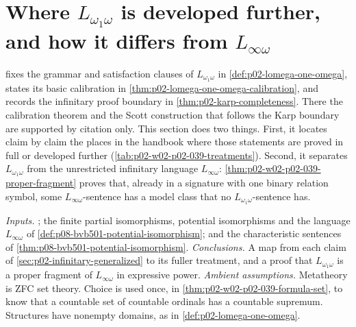 \section{Where \(L_{\omega_1\omega}\) is developed further, and how it differs from \(L_{\infty\omega}\)}
\label{sec:p02-w02-p02-039-lomega-treatments}

 fixes the grammar and satisfaction
clauses of \(L_{\omega_1\omega}\) in \cref{def:p02-lomega-one-omega}, states
its basic calibration in \cref{thm:p02-lomega-one-omega-calibration}, and
records the infinitary proof boundary in \cref{thm:p02-karp-completeness}.
There the calibration theorem and the Scott construction that follows the
Karp boundary are supported by citation only.  This section does two things.
First, it locates claim by claim the places in the handbook where those
statements are proved in full or developed further
(\cref{tab:p02-w02-p02-039-treatments}).  Second, it separates
\(L_{\omega_1\omega}\) from the unrestricted infinitary language
\(L_{\infty\omega}\): \cref{thm:p02-w02-p02-039-proper-fragment} proves that,
already in a signature with one binary relation symbol, some
\(L_{\infty\omega}\)-sentence has a model class that no
\(L_{\omega_1\omega}\)-sentence has.

\emph{Inputs.}  ; the finite partial
isomorphisms, potential isomorphisms and the language \(L_{\infty\omega}\) of
\cref{def:p08-bvb501-potential-isomorphism}; and the characteristic sentences
of \cref{thm:p08-bvb501-potential-isomorphism}.  \emph{Conclusions.}  A map
from each claim of \cref{sec:p02-infinitary-generalized} to its fuller
treatment, and a proof that \(L_{\omega_1\omega}\) is a proper fragment of
\(L_{\infty\omega}\) in expressive power.  \emph{Ambient assumptions.}
Metatheory is ZFC set theory.  Choice is used once, in
\cref{thm:p02-w02-p02-039-formula-set}, to know that a countable set of
countable ordinals has a countable supremum.  Structures have nonempty
domains, as in \cref{def:p02-lomega-one-omega}.

